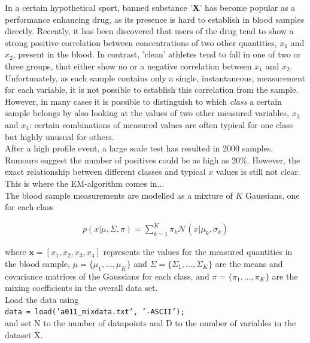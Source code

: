 \documentclass[a4paper]{article}
\begin{document}
In a certain hypothetical sport, banned substance '\textbf{X}' has become popular as a performance enhancing drug, as its presence is hard to establish in blood samples directly. Recently, it has been discovered that users of the drug tend to show a strong positive correlation between concentrations of two other quantities, $x_1$ and $x_2$, present in the blood. In contrast, 'clean' athletes tend to fall in one of two or three groups, that either show no or a negative correlation between $x_1$ and $x_2$. Unfortunately, as each sample contains only a single, instantaneous, measurement for each variable, it is not possible to establish this correlation from the sample. However, in many cases it is possible to distinguish to which \textit{class} a certain sample belongs by also looking at the values of two other measured variables, $x_3$ and $x_4$: certain combinations of measured values are often typical for one class but highly unusual for others.\\
After a high profile event, a large scale test has resulted in 2000 samples. Rumours suggest the number of positives could be as high as 20\%. However, the exact relationship between different classes and typical $x$ values is still not clear. This is where the EM-algorithm comes in...\\

The blood sample measurements are modelled as a mixture of $K$ Gaussians, one for each class

\begin{eqnarray} \label{eq:7}
p(x | \mu, \Sigma, \pi) = \sum^K_{k = 1} \pi_k \mathcal{N}(x | \mu_k, \sigma_k)
\end{eqnarray}

where $\textbf{x} = [x_1, x_2, x_3, x_4]$ represents the values for the measured quantities in the blood sample, $\mu = \{ \mu_1, ..., \mu_K\}$ and $\Sigma = \{ \Sigma_1, ..., \Sigma_K\}$ are the means and covariance matrices of the Gaussians for each class, and $\pi = \{ \pi_1, ..., \pi_K\}$ are the mixing coefficients in the overall data set.\\

Load the data using\\

\hspace{1cm} \texttt{data = load('a011\_mixdata.txt', '-ASCII');}\\

and set N to the number of datapoints and D to the number of variables in the dataset X.
\end{document}
